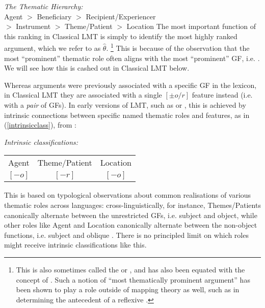 \documentclass[output=paper]{langscibook}
\begin{document}
\ea\label{ex:thematic-hierarchy-repeat}
\textit{The Thematic Hierarchy:}\\
Agent $>$ Beneficiary $>$ Recipient\slash Experiencer\\%
\hfill $>$ Instrument $>$ Theme/Patient $>$ Location%
\z
%
The most important function of this ranking in Classical LMT is simply to
identify the most highly ranked argument, which we refer to as $\hat{\theta}$.%
%
\footnote{This is also sometimes called the  or
  , and has also been equated with the concept of
  . Such a notion of ``most thematically prominent
  argument'' has been shown to play a role outside of mapping theory as well,
  such as in determining the antecedent of a reflexive
  \citep{dalrymple1993,Joshi93,MohananT1994,manning:dissociations}.}
%
This is because of the observation that the most ``prominent'' thematic role
often aligns with the most ``prominent'' GF, i.e. \SUBJ
\citep{fillmore:case,Grimshaw90,speas1990}. We will see how this is cashed out
in Classical LMT below.

Whereas arguments were previously associated with a specific GF in the lexicon,
in Classical LMT they are associated with a single $[\pm o/r]$ feature instead
(i.e. with a \emph{pair} of GFs). In early versions of LMT, such as
\citet[25--26]{bresnan1989locative} or \citet{BresMosh90}, this is achieved by
intrinsic connections between specific named thematic roles and features, as in
(\ref{intrinsicclass}), from \citet[168]{BresMosh90}:

\ea \label{intrinsicclass}
\textit{Intrinsic classifications:}\\[0.5ex]
\begin{tabular}{@{}ccc}
  Agent & Theme\slash Patient & Location\\
  $[-o]$& $[-r]$ & $[-o]$
\end{tabular}
\z
%
This is based on typological observations about common realisations of various
thematic roles across languages: cross-linguistically, for instance,
Themes\slash Patients canonically alternate between the unrestricted GFs, i.e.
subject and object, while other roles like Agent and Location canonically
alternate between the non-object functions, i.e. subject and oblique
\citep[26]{bresnan1989locative}. There is no principled limit on which roles
might receive intrinsic classifications like this.
\end{document}
